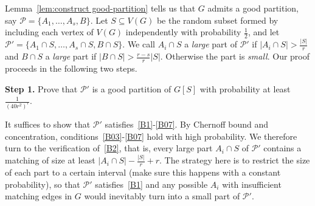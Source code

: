 \documentclass[11pt, a4paper]{article}
\theoremstyle{definition}
\newcommand{\<}{\subseteq}
\begin{document}
Lemma~\ref{lem:construct good-partition} tells us that $G$ admits a good partition, say  $\mathcal{P}=\{A_1,\ldots,A_s,B\}$. Let $S\subseteq V(G)$ be the random subset formed by including each vertex of $V(G)$ independently with probability $\frac{1}{2}$, and let $\mathcal{P}'=\{A_1\cap S,\ldots,A_s\cap S,B\cap S\}$.
{We call $A_i\cap S$ a \textit{large} part of $\mathcal{P}'$ if $|A_i\cap S|>\frac{|S|}{r}$ and $B\cap S$ a \textit{large} part if $|B\cap S|>\frac{r-s}{r}|S|$. Otherwise the part is \textit{small}.}
Our proof proceeds in the following two steps.

\medskip
{\bf Step 1.} Prove that $\mathcal{P}'$ is a good partition of $G[S]$ with probability at least $\frac{1}{(40r^2)^r}$.
\medskip




It suffices to show that $\mathcal{P}'$ satisfies~\ref{B1}-\ref{B07}. By Chernoff bound and concentration, conditions~\ref{B03}-\ref{B07} hold with high probability.
We therefore turn to the verification of~\ref{B2}, that is, every large part $A_i\cap S$ of $\mathcal{P}'$ contains a matching of size at least $|A_i\cap S|-\frac{|S|}{r}+r$. The strategy here is to restrict the size of each part  to a certain interval (make sure this happens with a constant probability), so that {$\mathcal{P}'$ satisfies~\ref{B1} and} any possible \( A_i \) with insufficient matching edges in \( G \) would inevitably turn into a small part of \(\mathcal{P}'\).
\end{document}
